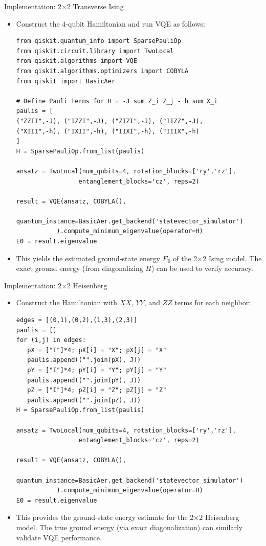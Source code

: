 \documentclass{beamer}
\begin{document}
\begin{frame}[fragile]{Implementation: 2×2 Transverse Ising}
\begin{itemize}
\item Construct the 4-qubit Hamiltonian and run VQE as follows:
\begin{verbatim}
from qiskit.quantum_info import SparsePauliOp
from qiskit.circuit.library import TwoLocal
from qiskit.algorithms import VQE
from qiskit.algorithms.optimizers import COBYLA
from qiskit import BasicAer

# Define Pauli terms for H = -J sum Z_i Z_j - h sum X_i
paulis = [
("ZZII",-J), ("IZZI",-J), ("ZIZI",-J), ("IIZZ",-J),
("XIII",-h), ("IXII",-h), ("IIXI",-h), ("IIIX",-h)
]
H = SparsePauliOp.from_list(paulis)

ansatz = TwoLocal(num_qubits=4, rotation_blocks=['ry','rz'],
                 entanglement_blocks='cz', reps=2)

result = VQE(ansatz, COBYLA(),
            quantum_instance=BasicAer.get_backend('statevector_simulator')
           ).compute_minimum_eigenvalue(operator=H)
E0 = result.eigenvalue
\end{verbatim}
\item This yields the estimated ground-state energy $E_0$ of the 2×2 Ising model. The exact ground energy (from diagonalizing $H$) can be used to verify accuracy.
\end{itemize}
\end{frame}

\begin{frame}[fragile]{Implementation: 2×2 Heisenberg}
\begin{itemize}
\item Construct the Hamiltonian with $XX$, $YY$, and $ZZ$ terms for each neighbor:
\begin{verbatim}
edges = [(0,1),(0,2),(1,3),(2,3)]
paulis = []
for (i,j) in edges:
   pX = ["I"]*4; pX[i] = "X"; pX[j] = "X"
   paulis.append(("".join(pX), J))
   pY = ["I"]*4; pY[i] = "Y"; pY[j] = "Y"
   paulis.append(("".join(pY), J))
   pZ = ["I"]*4; pZ[i] = "Z"; pZ[j] = "Z"
   paulis.append(("".join(pZ), J))
H = SparsePauliOp.from_list(paulis)

ansatz = TwoLocal(num_qubits=4, rotation_blocks=['ry','rz'],
                 entanglement_blocks='cz', reps=2)

result = VQE(ansatz, COBYLA(),
            quantum_instance=BasicAer.get_backend('statevector_simulator')
           ).compute_minimum_eigenvalue(operator=H)
E0 = result.eigenvalue
\end{verbatim}
\item This provides the ground-state energy estimate for the 2×2 Heisenberg model. The true ground energy (via exact diagonalization) can similarly validate VQE performance.
\end{itemize}
\end{frame}
\end{document}
